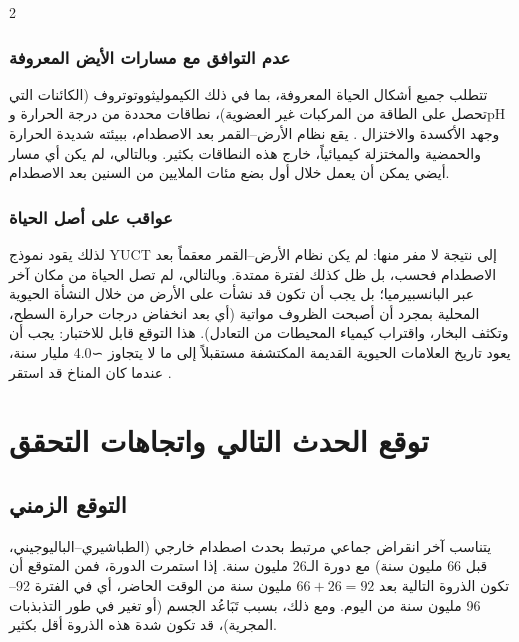\documentclass[11pt,a4paper]{article}
\begin{document}
\begin{multicols}{2}
		\subsubsection{عدم التوافق مع مسارات الأيض المعروفة}
		تتطلب جميع أشكال الحياة المعروفة، بما في ذلك الكيموليثووتوتروف (الكائنات التي تحصل على الطاقة من المركبات غير العضوية)، نطاقات محددة من درجة الحرارة وpH وجهد الأكسدة والاختزال \cite{Chemolithoautotroph}. يقع نظام الأرض–القمر بعد الاصطدام، ببيئته شديدة الحرارة والحمضية والمختزلة كيميائياً، خارج هذه النطاقات بكثير. وبالتالي، لم يكن أي مسار أيضي يمكن أن يعمل خلال أول بضع مئات الملايين من السنين بعد الاصطدام.
		
		\subsubsection{عواقب على أصل الحياة}
		لذلك يقود نموذج YUCT إلى نتيجة لا مفر منها: لم يكن نظام الأرض–القمر معقماً بعد الاصطدام فحسب، بل ظل كذلك لفترة ممتدة. وبالتالي، لم تصل الحياة من مكان آخر عبر البانسبيرميا؛ بل يجب أن تكون قد نشأت على الأرض من خلال النشأة الحيوية المحلية بمجرد أن أصبحت الظروف مواتية (أي بعد انخفاض درجات حرارة السطح، وتكثف البخار، واقتراب كيمياء المحيطات من التعادل). هذا التوقع قابل للاختبار: يجب أن يعود تاريخ العلامات الحيوية القديمة المكتشفة مستقبلاً إلى ما لا يتجاوز ∼4.0 مليار سنة، عندما كان المناخ قد استقر \cite{AbiogenesisReview}.
		
		\section{توقع الحدث التالي واتجاهات التحقق}
		\subsection{التوقع الزمني}
		يتناسب آخر انقراض جماعي مرتبط بحدث اصطدام خارجي (الطباشيري–الباليوجيني، قبل 66 مليون سنة) مع دورة الـ26 مليون سنة. إذا استمرت الدورة، فمن المتوقع أن تكون الذروة التالية بعد \(66 + 26 = 92\) مليون سنة من الوقت الحاضر، أي في الفترة 92–96 مليون سنة من اليوم. ومع ذلك، بسبب تَبَاعُد الجسم (أو تغير في طور التذبذبات المجرية)، قد تكون شدة هذه الذروة أقل بكثير.
		

\end{multicols}
\end{document}
